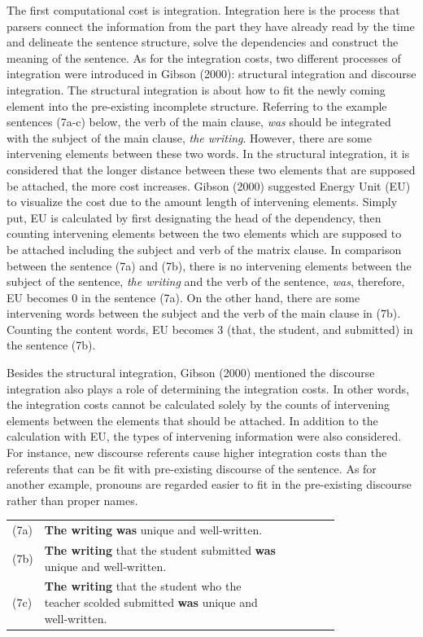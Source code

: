 \documentclass[
]{article}
\begin{document}
The first computational cost is integration. Integration here is the
process that parsers connect the information from the part they have
already read by the time and delineate the sentence structure, solve the
dependencies and construct the meaning of the sentence. As for the
integration costs, two different processes of integration were
introduced in Gibson (2000): structural integration and discourse
integration. The structural integration is about how to fit the newly
coming element into the pre-existing incomplete structure. Referring to
the example sentences (7a-c) below, the verb of the main clause,
\emph{was} should be integrated with the subject of the main clause,
\emph{the writing}. However, there are some intervening elements between
these two words. In the structural integration, it is considered that
the longer distance between these two elements that are supposed be
attached, the more cost increases. Gibson (2000) suggested Energy Unit
(EU) to visualize the cost due to the amount length of intervening
elements. Simply put, EU is calculated by first designating the head of
the dependency, then counting intervening elements between the two
elements which are supposed to be attached including the subject and
verb of the matrix clause. In comparison between the sentence (7a) and
(7b), there is no intervening elements between the subject of the
sentence, \emph{the writing} and the verb of the sentence, \emph{was},
therefore, EU becomes 0 in the sentence (7a). On the other hand, there
are some intervening words between the subject and the verb of the main
clause in (7b). Counting the content words, EU becomes 3 (that, the
student, and submitted) in the sentence (7b).

Besides the structural integration, Gibson (2000) mentioned the
discourse integration also plays a role of determining the integration
costs. In other words, the integration costs cannot be calculated solely
by the counts of intervening elements between the elements that should
be attached. In addition to the calculation with EU, the types of
intervening information were also considered. For instance, new
discourse referents cause higher integration costs than the referents
that can be fit with pre-existing discourse of the sentence. As for
another example, pronouns are regarded easier to fit in the pre-existing
discourse rather than proper names.

\vspace{1em}

\setlength{\parindent}{0pt}
\noindent
\begin{tabular}[t]{@{}p{0.05\linewidth} p{0.75\linewidth} >{\raggedleft\arraybackslash}p{2.5cm}@{}}
(7a) & \textbf{The writing} \textbf{was} unique and well-written. & [EU = 0] \\
(7b) & \textbf{The writing} that the student submitted \textbf{was} unique and well-written. & [EU = 3] \\
(7c) & \textbf{The writing} that the student who the teacher scolded submitted \textbf{was} unique and well-written. & [EU = 6] \\
\end{tabular}
\end{document}
